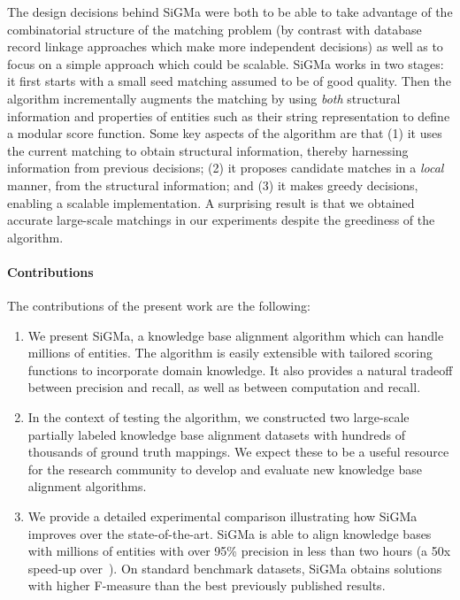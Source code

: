 \documentclass{sig-alternate}
\begin{document}
The design decisions behind \textsf{SiGMa} were both to be able to take advantage of the combinatorial structure of the matching problem (by contrast with database record linkage approaches which make more independent decisions) as well as to focus on a simple approach which could be scalable. \textsf{SiGMa} works in two stages: it first starts with a small seed matching assumed to be of good quality. Then the algorithm incrementally augments the matching by using \emph{both} structural information and properties of entities such as their string representation to define a modular score function. Some key aspects of the algorithm are that (1) it uses the current matching to obtain structural information, thereby harnessing information from previous decisions; (2) it proposes candidate matches in a \emph{local} manner, from the structural information; and (3) it makes greedy decisions, enabling a scalable implementation. A surprising result is that we obtained accurate large-scale matchings in our experiments despite the greediness of the algorithm.

%

\paragraph*{Contributions} The contributions of the present work are the following:
\begin{enumerate}
\item We present \textsf{SiGMa}, a knowledge base alignment algorithm which can handle millions of entities. The algorithm is easily extensible with tailored scoring functions to incorporate domain knowledge. It also provides a natural tradeoff between precision and recall, as well as between computation and recall.
  \item In the context of testing the algorithm, we constructed two large-scale partially labeled knowledge base
    alignment datasets with hundreds of thousands of ground truth mappings. We expect these to be a useful resource for the research community to develop and evaluate new knowledge base alignment algorithms.
  \item We provide a detailed experimental comparison illustrating how \textsf{SiGMa} improves over the state-of-the-art. \textsf{SiGMa} is able to align knowledge bases with millions of entities with over 95\% precision in less than two hours (a 50x speed-up over~\cite{suchanek12PARIS}). On standard benchmark datasets, \textsf{SiGMa} obtains solutions with higher F-measure than the best previously published results.
\end{enumerate}
\end{document}
